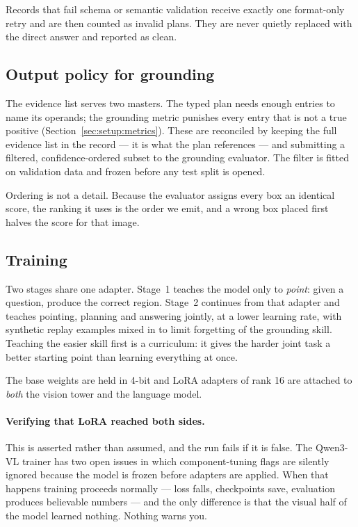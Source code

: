 Records that fail schema or semantic validation receive exactly one format-only retry and are then
counted as invalid plans. They are never quietly replaced with the direct answer and reported as
clean.

\subsection{Output policy for grounding}
\label{sec:method:boxes}

The evidence list serves two masters. The typed plan needs enough entries to name its operands; the
grounding metric punishes every entry that is not a true positive
(Section~\ref{sec:setup:metrics}). These are reconciled by keeping the full evidence list in the
record --- it is what the plan references --- and submitting a filtered, confidence-ordered subset
to the grounding evaluator. The filter is fitted on validation data and frozen before any test split
is opened.

Ordering is not a detail. Because the evaluator assigns every box an identical score, the ranking it
uses is the order we emit, and a wrong box placed first halves the score for that image.

\subsection{Training}
\label{sec:method:training}

Two stages share one adapter. Stage~1 teaches the model only to \emph{point}: given a question,
produce the correct region. Stage~2 continues from that adapter and teaches pointing, planning and
answering jointly, at a lower learning rate, with synthetic replay examples mixed in to limit
forgetting of the grounding skill. Teaching the easier skill first is a curriculum: it gives the
harder joint task a better starting point than learning everything at once.

The base weights are held in 4-bit and LoRA adapters of rank 16 are attached to \emph{both} the
vision tower and the language model.

\paragraph{Verifying that LoRA reached both sides.}
This is asserted rather than assumed, and the run fails if it is false. The Qwen3-VL trainer has two
open issues in which component-tuning flags are silently ignored because the model is frozen before
adapters are applied. When that happens training proceeds normally --- loss falls, checkpoints save,
evaluation produces believable numbers --- and the only difference is that the visual half of the
model learned nothing. Nothing warns you.

